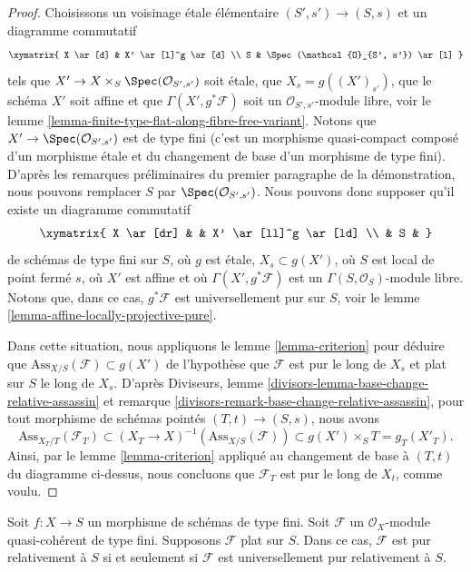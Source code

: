\begin{proof}
\medskip\noindent
Choisissons un voisinage \'etale élémentaire $(S', s') \to (S, s)$ et
un diagramme commutatif
$$
\xymatrix{
X \ar[d] & X' \ar[l]^g \ar[d] \\
S & \Spec(\mathcal{O}_{S', s'}) \ar[l]
}
$$
tels que $X' \to X \times_S \Spec(\mathcal{O}_{S', s'})$
soit \'etale, que $X_s = g((X')_{s'})$, que le schéma $X'$ soit affine
et que $\Gamma(X', g^*\mathcal{F})$ soit un
$\mathcal{O}_{S', s'}$-module libre, voir le
lemme \ref{lemma-finite-type-flat-along-fibre-free-variant}.
Notons que $X' \to \Spec(\mathcal{O}_{S', s'})$ est de type fini
(c'est un morphisme quasi-compact composé d'un morphisme \'etale
et du changement de base d'un morphisme de type fini).
D'après les remarques préliminaires du premier paragraphe de la démonstration,
nous pouvons remplacer $S$ par $\Spec(\mathcal{O}_{S', s'})$. Nous pouvons donc
supposer qu'il existe un diagramme commutatif
$$
\xymatrix{
X \ar[dr] & & X' \ar[ll]^g \ar[ld] \\
& S &
}
$$
de schémas de type fini sur $S$, où $g$ est \'etale, $X_s \subset g(X')$,
où $S$ est local de point fermé $s$, où $X'$ est affine et où
$\Gamma(X', g^*\mathcal{F})$ est un $\Gamma(S, \mathcal{O}_S)$-module libre.
Notons que, dans ce cas, $g^*\mathcal{F}$ est universellement pur sur $S$, voir le
lemme \ref{lemma-affine-locally-projective-pure}.

\medskip\noindent
Dans cette situation, nous appliquons le
lemme \ref{lemma-criterion}
pour déduire que $\text{Ass}_{X/S}(\mathcal{F}) \subset g(X')$
de l'hypothèse que $\mathcal{F}$ est pur le long de $X_s$
et plat sur $S$ le long de $X_s$. D'après
Diviseurs, lemme \ref{divisors-lemma-base-change-relative-assassin} et
remarque \ref{divisors-remark-base-change-relative-assassin},
pour tout morphisme de schémas pointés
$(T, t) \to (S, s)$, nous avons
$$
\text{Ass}_{X_T/T}(\mathcal{F}_T) \subset
(X_T \to X)^{-1}(\text{Ass}_{X/S}(\mathcal{F})) \subset
g(X') \times_S T = g_T(X'_T).
$$
Ainsi, par le
lemme \ref{lemma-criterion}
appliqué au changement de base à $(T, t)$ du diagramme ci-dessus,
nous concluons que $\mathcal{F}_T$ est pur le long de $X_t$, comme voulu.
\end{proof}

\begin{lemma}
\label{lemma-finite-type-flat-pure-is-universal}
Soit $f : X \to S$ un morphisme de schémas de type fini.
Soit $\mathcal{F}$ un $\mathcal{O}_X$-module quasi-cohérent de type fini.
Supposons $\mathcal{F}$ plat sur $S$. Dans ce cas,
$\mathcal{F}$ est pur relativement à $S$ si et seulement si $\mathcal{F}$
est universellement pur relativement à $S$.
\end{lemma}

